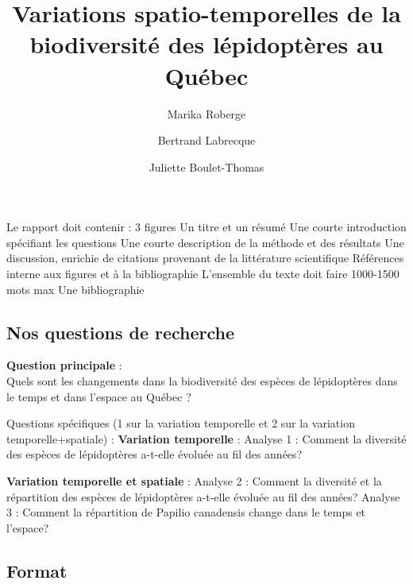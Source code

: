 \documentclass[9pt,twocolumn,twoside,]{pnas-new}
\title{Variations spatio-temporelles de la biodiversité des lépidoptères
au Québec}
\author[a]{Marika Roberge}
\author[a]{Bertrand Labrecque}
\author[a]{Juliette Boulet-Thomas}
\affil[a]{Faculté des sciences, Département de biologie, 2500
Boulevard de l'Université, Sherbrooke, Québec, J1K 2R1}
\begin{document}
\verticaladjustment{-2pt}



\maketitle
\thispagestyle{firststyle}


\acknow{}

Le rapport doit contenir : 3 figures Un titre et un résumé Une courte
introduction spécifiant les questions Une courte description de la
méthode et des résultats Une discussion, enrichie de citations provenant
de la littérature scientifique Références interne aux figures et à la
bibliographie L'ensemble du texte doit faire 1000-1500 mots max Une
bibliographie

\subsection{Nos questions de
recherche}\label{nos-questions-de-recherche}

\textbf{Question principale} :\\
Quels sont les changements dans la biodiversité des espèces de
lépidoptères dans le temps et dans l'espace au Québec ?

Questions spécifiques (1 sur la variation temporelle et 2 sur la
variation temporelle+spatiale) : \textbf{Variation temporelle} : Analyse
1 : Comment la diversité des espèces de lépidoptères a-t-elle évoluée au
fil des années?

\textbf{Variation temporelle et spatiale} : Analyse 2 : Comment la
diversité et la répartition des espèces de lépidoptères a-t-elle évoluée
au fil des années? Analyse 3 : Comment la répartition de Papilio
canadensis change dans le temps et l'espace?

\subsection*{Format}\label{format}
\end{document}
